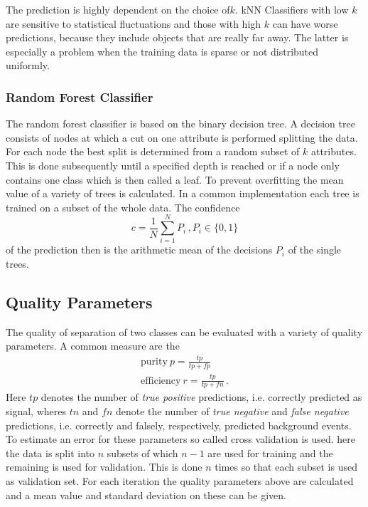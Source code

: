 The prediction is highly dependent on the choice of$k$. kNN Classifiers with low $k$ are sensitive to statistical fluctuations and those with high $k$ can have worse predictions, because they include objects that are really far away. The latter is especially a problem when the training data is sparse or not distributed uniformly.

\subsubsection*{Random Forest Classifier}
The random forest classifier is based on the binary decision tree.
A decision tree consists of nodes at which a cut on one attribute is performed splitting the data. For each node the best split is determined from a random subset of $k$ attributes.
This is done subsequently until a specified depth is reached or if a node only contains one class which is then called a leaf. To prevent overfitting the mean value of a variety of trees is calculated. In a common implementation each tree is trained on a subset of the whole data. The confidence
\begin{equation*}
  c  = \frac{1}{N} \sum\limits_{i=1}^{N} P_i \, , P_i \in \{0,1\}
\end{equation*}
of the prediction then is the arithmetic mean of the decisions $P_i$ of the single trees.

\subsection{Quality Parameters}
The quality of separation of two classes can be evaluated with a variety of quality parameters. A common measure are the
\begin{align*}
  \mathrm{purity}\ p = \frac{tp}{tp + fp} \\
  \mathrm{efficiency} \ r = \frac{tp}{tp + fn}\, .
\end{align*}
Here $tp$ denotes the number of \textit{true positive} predictions, i.e. correctly predicted as signal, wheres $tn$ and $fn$ denote the number of  \textit{true negative} and \textit{false negative} predictions, i.e. correctly and falsely, respectively, predicted background events.\\

To estimate an error for these parameters so called cross validation is used. here the data is split into $n$ subsets of which $n - 1$ are used for training and the remaining is used for validation. This is done $n$ times so that each subset is used as validation set. For each iteration the quality parameters above are calculated and a mean value and standard deviation on these can be given.\\

